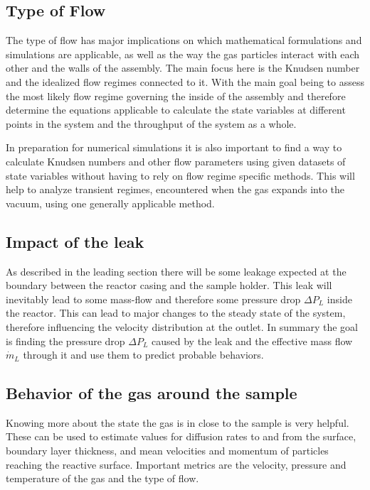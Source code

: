 \subsection{Type of Flow}

	The type of flow has major implications on which mathematical formulations and simulations are applicable, as well as the way the gas particles interact with each other and the walls of the assembly. 
	The main focus here is the Knudsen number and the idealized flow regimes connected to it.
	With the main goal being to assess the most likely flow regime governing the inside of the assembly and therefore determine the equations applicable to calculate the state variables at different points in the system and the throughput of the system as a whole.

	In preparation for numerical simulations it is also important to find a way to calculate Knudsen numbers and other flow parameters using given datasets of state variables without having to rely on flow regime specific methods. This will help to analyze transient regimes, encountered when the gas expands into the vacuum, using one generally applicable method.  

\subsection{Impact of the leak}

	As described in the leading section there will be some leakage expected at the boundary between the reactor casing and the sample holder.
	This leak will inevitably lead to some mass-flow and therefore some pressure drop $\Delta P_L$ inside the reactor.
	This can lead to major changes to the steady state of the system, therefore influencing the velocity distribution at the outlet.
	In summary the goal is finding the pressure drop $\Delta P_L$ caused by the leak and the effective mass flow $\dot{m}_L$ through it and use them to predict probable behaviors.

\subsection{Behavior of the gas around the sample}

	Knowing more about the state the gas is in close to the sample is very helpful.
	These can be used to estimate values for diffusion rates to and from the surface, boundary layer thickness, and mean velocities and momentum of particles reaching the reactive surface. 
	Important metrics are the velocity, pressure and temperature of the gas and the type of flow.

